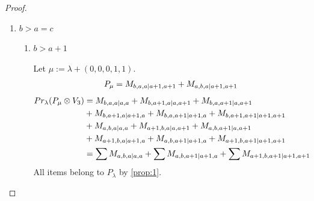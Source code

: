 \begin{proof}
\begin{enumerate}
    \item $b>a=c$
      \begin{enumerate}
        \item $b>a+1$ \par
        Let $\mu:=\lambda + (0,0,0,1,1) $.
        \begin{equation}\notag
          \begin{aligned}
            P_\mu = M_{b,a,a|a+1,a+1}
+ M_{a,b,a|a+1,a+1}
          \end{aligned}
        \end{equation}
        \begin{equation}\notag
          \begin{aligned}
            Pr_{\lambda}(P_\mu \otimes V_{3}) &=
M_{b,a,a|a,a}
+ M_{b,a+1,a|a,a+1}
+ M_{b,a,a+1|a,a+1}\\
                                              &
+ M_{b,a+1,a|a+1,a}
+ M_{b,a,a+1|a+1,a}
+ M_{b,a+1,a+1|a+1,a+1}\\
                                              &
+ M_{a,b,a|a,a}
+ M_{a+1,b,a|a,a+1}
+ M_{a,b,a+1|a,a+1}\\
                                              &
+ M_{a+1,b,a|a+1,a}
+ M_{a,b,a+1|a+1,a}
+ M_{a+1,b,a+1|a+1,a+1} \\
                                               &=
\sum M_{a,b,a|a,a}
+ \sum M_{a,b,a+1|a+1,a}
+ \sum M_{a+1,b,a+1|a+1,a+1}
          \end{aligned}
        \end{equation}
All items belong to $P_\lambda$ by \cref{prop:1}.


\end{enumerate}
\end{enumerate}
\end{proof}
